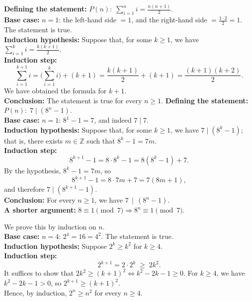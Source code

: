 {
\textbf{Defining the statement:} \(P(n):\; \sum_{i=1}^n i=\frac{n(n+1)}{2}\).\\
\textbf{Base case:} \(n=1\): the left-hand side \(=1\), and the right-hand side \(=\frac{1\cdot 2}{2}=1\). The statement is true.\\
\textbf{Induction hypothesis:} Suppose that, for some \(k\ge1\), we have \(\sum_{i=1}^{k} i=\frac{k(k+1)}{2}\).\\
\textbf{Induction step:}
\[
\sum_{i=1}^{k+1} i=\Big(\sum_{i=1}^{k} i\Big)+(k+1)=\frac{k(k+1)}{2}+(k+1)=\frac{(k+1)(k+2)}{2}.
\]
We have obtained the formula for \(k+1\).\\
\textbf{Conclusion:} The statement is true for every \(n\ge1\).
}
{
\textbf{Defining the statement:} \(P(n):\; 7\mid (8^n-1)\).\\
\textbf{Base case:} \(n=1\): \(8^1-1=7\), and indeed \(7\mid 7\).\\
\textbf{Induction hypothesis:} Suppose that, for some \(k\ge1\), we have \(7\mid (8^k-1)\); that is, there exists \(m\in\mathbb{Z}\) such that \(8^k-1=7m\).\\
\textbf{Induction step:}
\[
8^{k+1}-1=8\cdot 8^k-1=8(8^k-1)+7.
\]
By the hypothesis, \(8^k-1=7m\), so
\[
8^{k+1}-1=8\cdot 7m+7=7(8m+1),
\]
and therefore \(7\mid (8^{k+1}-1)\).\\
\textbf{Conclusion:} For every \(n\ge1\), we have \(7\,\mid\,\left(8^{n}-1\right)\). \\
\textbf{A shorter argument:} \(8\equiv 1\pmod{7}\Rightarrow 8^n\equiv 1 \pmod{7}\).
}

{
We prove this by induction on \(n\).\\
\textbf{Base case:} \(n=4\): \(2^4=16=4^2\). The statement is true.\\
\textbf{Induction hypothesis:} Suppose \(2^k\ge k^2\) for \(k\ge 4\).\\
\textbf{Induction step:}
\[
2^{k+1}=2\cdot 2^k \;\ge\; 2k^2.
\]
It suffices to show that \(2k^2\ge (k+1)^2 \iff k^2-2k-1\ge 0\).
For \(k\ge 4\), we have \(k^2-2k-1>0\), so \(2^{k+1}\ge (k+1)^2\).\\
Hence, by induction, \(2^{n}\ge n^{2}\) for every \(n\ge 4\).
}

